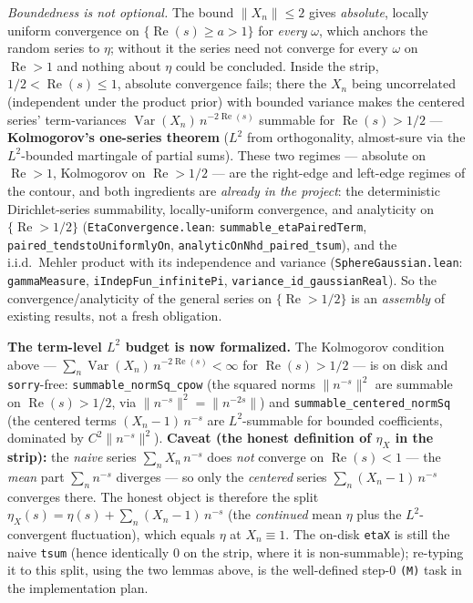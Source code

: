 \documentclass[11pt,a4paper]{article}
\theoremstyle{definition}
\newcommand{\Rea}{\operatorname{Re}}
\newcommand{\etaX}{\eta_X}
\begin{document}
\emph{Boundedness is not optional.} The bound \(\|X_n\|\le 2\) gives \emph{absolute},
locally uniform convergence on \(\{\Rea(s)\ge a>1\}\) for \emph{every}
\(\omega\), which anchors the random series to \(\eta\); without it the series need not
converge for every \(\omega\) on \(\Rea>1\) and nothing about \(\eta\) could be concluded. Inside the strip,
\(1/2<\Rea(s)\le1\), absolute convergence fails; there the \(X_n\) being uncorrelated
(independent under the product prior) with bounded variance makes the centered series'
term-variances \(\operatorname{Var}(X_n)\,n^{-2\Rea(s)}\) summable for \(\Rea(s)>1/2\) ---
\textbf{Kolmogorov's one-series theorem} (\(L^2\) from orthogonality, almost-sure via the
\(L^2\)-bounded martingale of partial sums). These two regimes --- absolute on \(\Rea>1\),
Kolmogorov on \(\Rea>1/2\) --- are the right-edge and left-edge regimes of the contour,
and both ingredients are \emph{already in the project}: the deterministic Dirichlet-series
summability, locally-uniform convergence, and analyticity on \(\{\Rea>1/2\}\)
(\texttt{EtaConvergence.lean}: \texttt{summable\_etaPairedTerm},
\texttt{paired\_tendstoUniformlyOn}, \texttt{analyticOnNhd\_paired\_tsum}), and the
i.i.d.\ Mehler product with its independence and variance (\texttt{SphereGaussian.lean}:
\texttt{gammaMeasure}, \texttt{iIndepFun\_infinitePi}, \texttt{variance\_id\_gaussianReal}).
So the convergence/analyticity of the general series on \(\{\Rea>1/2\}\) is an
\emph{assembly} of existing results, not a fresh obligation.

\textbf{The term-level \(L^2\) budget is now formalized.} The Kolmogorov condition above ---
\(\sum_n \operatorname{Var}(X_n)\,n^{-2\Rea(s)}<\infty\) for \(\Rea(s)>1/2\) --- is on disk and
\texttt{sorry}-free: \texttt{summable\_normSq\_cpow} (the squared norms \(\|n^{-s}\|^2\) are summable
on \(\Rea(s)>1/2\), via \(\|n^{-s}\|^2=\|n^{-2s}\|\)) and \texttt{summable\_centered\_normSq} (the
centered terms \((X_n-1)\,n^{-s}\) are \(L^2\)-summable for bounded coefficients, dominated by
\(C^2\|n^{-s}\|^2\)). \textbf{Caveat (the honest definition of \(\etaX\) in the strip):} the
\emph{naive} series \(\sum_n X_n\,n^{-s}\) does \emph{not} converge on \(\Rea(s)<1\) --- the
\emph{mean} part \(\sum_n n^{-s}\) diverges --- so only the \emph{centered} series
\(\sum_n (X_n-1)\,n^{-s}\) converges there. The honest object is therefore the split
\(\etaX(s)=\eta(s)+\sum_n(X_n-1)\,n^{-s}\) (the \emph{continued} mean \(\eta\) plus the
\(L^2\)-convergent fluctuation), which equals \(\eta\) at \(X_n\equiv1\). The on-disk \texttt{etaX}
is still the naive \texttt{tsum} (hence identically \(0\) on the strip, where it is non-summable);
re-typing it to this split, using the two lemmas above, is the well-defined step-0 \texttt{(M)}
task in the implementation plan.
\end{document}

